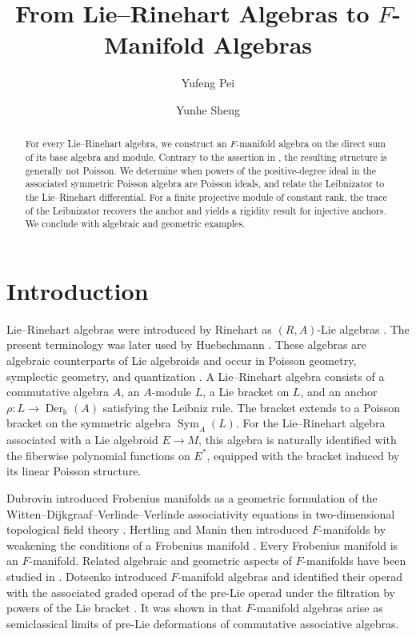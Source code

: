 \documentclass[12pt,reqno]{amsart}
\title[From Lie--Rinehart algebras to \texorpdfstring{$F$}{F}-manifold algebras]{From Lie--Rinehart Algebras to \texorpdfstring{$F$}{F}-Manifold Algebras}
\author{Yufeng Pei}
\author{Yunhe Sheng}
\theoremstyle{definition}
\theoremstyle{remark}
\newcommand{\kk}{\Bbbk}
\newcommand{\Der}{\operatorname{Der}}
\newcommand{\Sym}{\operatorname{Sym}}
\begin{document}
	
	
	\begin{abstract}
		For every Lie--Rinehart algebra, we construct an $F$-manifold algebra on the
		direct sum of its base algebra and module.   Contrary to the assertion in
		\cite[Proposition 13.3.26]{LodayVallette}, the resulting structure is generally
		not Poisson.  We determine when powers of the positive-degree ideal in the
		associated symmetric Poisson algebra are Poisson ideals, and relate the
		Leibnizator to the Lie--Rinehart differential.  For a finite projective module
		of constant rank, the trace of the Leibnizator recovers the anchor and yields a
		rigidity result for injective anchors.  We conclude with algebraic and
		geometric examples.
	\end{abstract}
	
	
	
	\maketitle
	
	
	
	\section{Introduction}
	
	Lie--Rinehart algebras were introduced by Rinehart as $(R,A)$-Lie algebras
	\cite{Rinehart}.  The present terminology was later used by Huebschmann
	\cite{Huebschmann1990,Huebschmann1998}.  These
	algebras are algebraic counterparts of Lie algebroids \cite{Mackenzie} and
	occur in Poisson geometry, symplectic geometry, and quantization
	\cite{Kosmann1996}.  A Lie--Rinehart algebra
	consists of a commutative algebra $A$, an $A$-module $L$, a Lie bracket on
	$L$, and an anchor $\rho:L\to\Der_\kk(A)$ satisfying the Leibniz rule.  The
	bracket extends to a Poisson bracket on the symmetric algebra $\Sym_A(L)$.
	For the Lie--Rinehart algebra associated with a Lie algebroid $E\to M$, this
	algebra is naturally identified with the fiberwise polynomial functions on
	$E^*$, equipped with the bracket induced by its linear Poisson structure.
	
	Dubrovin introduced Frobenius manifolds as a geometric formulation of the
	Witten--Dijkgraaf--Verlinde--Verlinde associativity equations in
	two-dimensional topological field theory \cite{Dub95}.  Hertling and Manin
	then introduced $F$-manifolds by weakening the conditions of a Frobenius
	manifold \cite{HertlingManin}.  Every Frobenius manifold is an
	$F$-manifold.  Related algebraic and geometric aspects of $F$-manifolds
	have been studied in \cite{BCMM,CT,CLD,DS11,Laubie,LPR11,Merku,TV}.
	Dotsenko introduced $F$-manifold algebras and identified their operad with the
	associated graded operad of the pre-Lie operad under the filtration by powers
	of the Lie bracket \cite{Dot}.  It was shown in \cite{LiuShengBai2020} that
	$F$-manifold algebras arise as semiclassical limits of pre-Lie deformations
	of commutative associative algebras.
	
\end{document}
